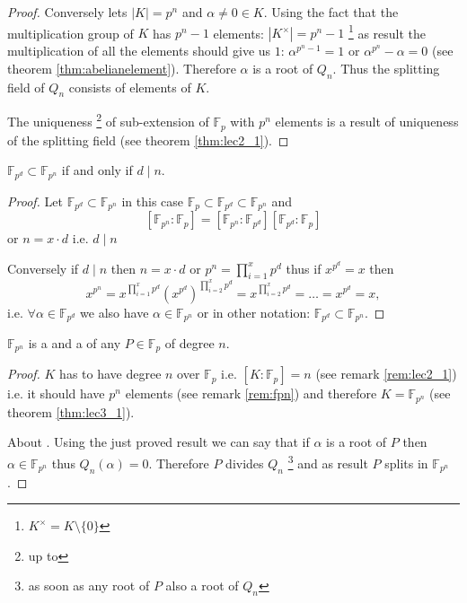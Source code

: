 \begin{theorem}
\begin{proof}
    Conversely lets $\left|K\right| = p^n$ and
    $\alpha \ne 0 \in K$.
    Using the fact that the multiplication group of $K$ has $p^n - 1$
    elements: $\left|K^\times\right| = p^n - 1$
    \footnote{
      $K^\times = K \setminus \{0\}$
    }
    as result the multiplication of all the elements should give us
    $1$: $\alpha^{p^n-1} = 1$ or $\alpha^{p^n} - \alpha = 0$
    (see theorem \ref{thm:abelianelement}).
    Therefore $\alpha$ is a root of $Q_n$. Thus the splitting field of
    $Q_n$ consists of elements of $K$.

    The uniqueness
    \footnote{
      up to 
    }
    of sub-extension of
    $\mathbb{F}_p$ with $p^n$ elements is a result of uniqueness of
    the splitting field (see theorem \ref{thm:lec2_1}). 
  \end{proof}
  \label{thm:lec3_1}
\end{theorem}

\begin{theorem}
  $\mathbb{F}_{p^d} \subset \mathbb{F}_{p^n}$ if and only if $d \mid n$. 
  \begin{proof}
    Let $\mathbb{F}_{p^d} \subset \mathbb{F}_{p^n}$ in this case
    $\mathbb{F}_p \subset \mathbb{F}_{p^d} \subset \mathbb{F}_{p^n}$
    and
    \[
    \left[\mathbb{F}_{p^n}:\mathbb{F}_{p}\right] =
    \left[\mathbb{F}_{p^n}:\mathbb{F}_{p^d}\right]
    \left[\mathbb{F}_{p^d}:\mathbb{F}_{p}\right]
    \]
    or $n = x \cdot d$ i.e. $d \mid n$

    Conversely if $d \mid n$ then $n = x \cdot d$ or
    $p^n = \prod^x_{i=1} p^d$ thus if $x^{p^d} = x$ then
    \[
    x^{p^n} = x^{\prod^x_{i=1} p^d}
    \left(x^{p^d}\right)^{\prod^x_{i=2} p^d} = x^{\prod^x_{i=2} p^d} =
    \dots = x^{p^d} = x,
    \]
    i.e. $\forall \alpha \in \mathbb{F}_{p^d}$ we also have
    $\alpha \in \mathbb{F}_{p^n}$ or in other notation:
    $\mathbb{F}_{p^d} \subset \mathbb{F}_{p^n}$.
  \end{proof}
  \label{thm:lec3_1_2}
\end{theorem}

\begin{theorem}
  $\mathbb{F}_{p^n}$ is a  and a
   of any 
  $P \in \mathbb{F}_p$ of degree $n$.
  \begin{proof}
     $K$ has to have degree $n$ over
    $\mathbb{F}_p$ i.e.
    $\left[K:\mathbb{F}_p\right] = n$ (see remark \ref{rem:lec2_1})
    i.e. it should have $p^n$
    elements (see remark \ref{rem:fpn})
    and therefore $K=\mathbb{F}_{p^n}$
    (see theorem \ref{thm:lec3_1}).

    About . Using the just proved result
    we can say that if $\alpha$ is a root of $P$
    then $\alpha \in \mathbb{F}_{p^n}$ thus
    $Q_n\left(\alpha\right) = 0$. Therefore $P$ divides $Q_n$ 
    \footnote{as soon as any root of $P$ also a root of $Q_n$} and as
    result $P$ splits in $\mathbb{F}_{p^n}$.
  \end{proof}
  \label{thm:lec3_1_3}
\end{theorem}

